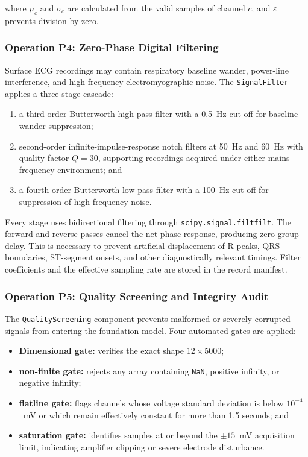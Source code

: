 \documentclass{ssnreview}
\begin{document}
where $\mu_c$ and $\sigma_c$ are calculated from the valid samples of channel $c$, and
$\varepsilon$ prevents division by zero.

\subsubsection{Operation P4: Zero-Phase Digital Filtering}

Surface ECG recordings may contain respiratory baseline wander, power-line interference,
and high-frequency electromyographic noise. The \texttt{SignalFilter} applies a
three-stage cascade:

\begin{enumerate}[label=\arabic*.,leftmargin=*,align=left]
  \item a third-order Butterworth high-pass filter with a 0.5~Hz cut-off for baseline-wander
  suppression;

  \item second-order infinite-impulse-response notch filters at 50~Hz and 60~Hz with
  quality factor $Q=30$, supporting recordings acquired under either mains-frequency
  environment; and

  \item a fourth-order Butterworth low-pass filter with a 100~Hz cut-off for suppression
  of high-frequency noise.
\end{enumerate}

Every stage uses bidirectional filtering through \texttt{scipy.signal.filtfilt}. The
forward and reverse passes cancel the net phase response, producing zero group delay. This
is necessary to prevent artificial displacement of R peaks, QRS boundaries, ST-segment
onsets, and other diagnostically relevant timings. Filter coefficients and the effective
sampling rate are stored in the record manifest.

\subsubsection{Operation P5: Quality Screening and Integrity Audit}

The \texttt{QualityScreening} component prevents malformed or severely corrupted signals
from entering the foundation model. Four automated gates are applied:

\begin{itemize}
  \item \textbf{Dimensional gate:} verifies the exact shape $12\times5000$;

  \item \textbf{non-finite gate:} rejects any array containing \texttt{NaN}, positive
  infinity, or negative infinity;

  \item \textbf{flatline gate:} flags channels whose voltage standard deviation is below
  $10^{-4}$~mV or which remain effectively constant for more than 1.5 seconds; and

  \item \textbf{saturation gate:} identifies samples at or beyond the $\pm15$~mV
  acquisition limit, indicating amplifier clipping or severe electrode disturbance.
\end{itemize}
\end{document}
